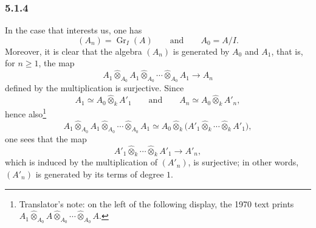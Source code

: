 
\subsubsection*{5.1.4}
\label{sga3:VIIB:5.1.4}

In the case that interests us, one has
\[
  (A_n)=\operatorname{Gr}_I(A)
  \qquad\text{and}\qquad
  A_0=A/I.
\]
Moreover, it is clear that the algebra \((A_n)\) is generated by
\(A_0\) and \(A_1\), that is, for \(n\geq1\), the map
\[
  A_1\widehat\otimes_{A_0}A_1\widehat\otimes_{A_0}\cdots
  \widehat\otimes_{A_0}A_1
  \longrightarrow A_n
\]
defined by the multiplication is surjective. Since
\[
  A_1\simeq A_0\widehat\otimes_kA'_1
  \qquad\text{and}\qquad
  A_n\simeq A_0\widehat\otimes_kA'_n,
\]
hence also\footnote{Translator's note: on the left of the following display, the 1970 text prints
\(A_1\widehat\otimes_{A_0}A\widehat\otimes_{A_0}\cdots\widehat\otimes_{A_0}A\).}
\[
  A_1\widehat\otimes_{A_0}A_1\widehat\otimes_{A_0}\cdots
  \widehat\otimes_{A_0}A_1
  \simeq
  A_0\widehat\otimes_k
  \bigl(A'_1\widehat\otimes_k\cdots\widehat\otimes_kA'_1\bigr),
\]
one sees that the map
\[
  A'_1\widehat\otimes_k\cdots\widehat\otimes_kA'_1
  \longrightarrow A'_n,
\]
which is induced by the multiplication of \((A'_n)\), is surjective;
in other words, \((A'_n)\) is generated by its terms of degree \(1\).
